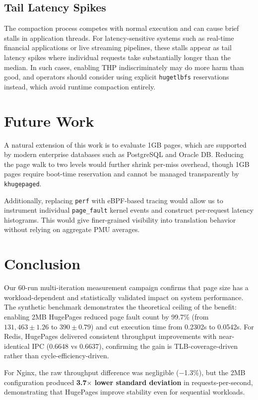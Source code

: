 \documentclass[conference]{IEEEtran}
\begin{document}
\subsection{Tail Latency Spikes}
The compaction process competes with normal execution and can cause brief stalls in application threads. For latency-sensitive systems such as real-time financial applications or live streaming pipelines, these stalls appear as tail latency spikes where individual requests take substantially longer than the median. In such cases, enabling THP indiscriminately may do more harm than good, and operators should consider using explicit \texttt{hugetlbfs} reservations instead, which avoid runtime compaction entirely.

\section{Future Work}
A natural extension of this work is to evaluate 1GB pages, which are supported by modern enterprise databases such as PostgreSQL and Oracle DB. Reducing the page walk to two levels would further shrink per-miss overhead, though 1GB pages require boot-time reservation and cannot be managed transparently by \texttt{khugepaged}.

Additionally, replacing \texttt{perf} with eBPF-based tracing would allow us to instrument individual \texttt{page\_fault} kernel events and construct per-request latency histograms. This would give finer-grained visibility into translation behavior without relying on aggregate PMU averages.

\section{Conclusion}
Our 60-run multi-iteration measurement campaign confirms that page size has a workload-dependent and statistically validated impact on system performance. The synthetic benchmark demonstrates the theoretical ceiling of the benefit: enabling 2MB HugePages reduced page fault count by 99.7\% (from $131{,}463 \pm 1.26$ to $390 \pm 0.79$) and cut execution time from 0.2302s to 0.0542s. For Redis, HugePages delivered consistent throughput improvements with near-identical IPC (0.6648 vs 0.6637), confirming the gain is TLB-coverage-driven rather than cycle-efficiency-driven.

For Nginx, the raw throughput difference was negligible ($-$1.3\%), but the 2MB configuration produced \textbf{3.7$\times$ lower standard deviation} in requests-per-second, demonstrating that HugePages improve stability even for sequential workloads.
\end{document}
